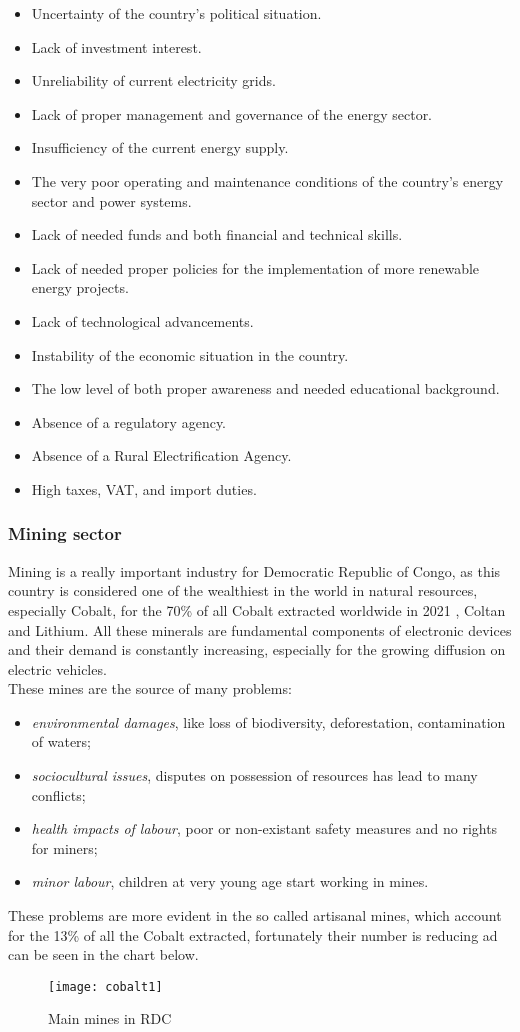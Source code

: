 \documentclass{article}
\begin{document}
\begin{itemize}
\item Uncertainty of the country's political situation. 
\item Lack of investment interest. 
\item Unreliability of current electricity grids. 
\item Lack of proper management and governance of the energy sector. 
\item Insufficiency of the current energy supply. 
\item The very poor operating and maintenance conditions of the country's energy sector and power systems. 
\item Lack of needed funds and both financial and technical skills. 
\item Lack of needed proper policies for the implementation of more renewable energy projects. 
\item Lack of technological advancements. 
\item Instability of the economic situation in the country. 
\item The low level of both proper awareness and needed educational background. 
\item Absence of a regulatory agency.
\item Absence of a Rural Electrification Agency.
\item High taxes, VAT, and import duties.
\end{itemize}
\newpage
\subsubsection{Mining sector}
Mining is a really important industry for Democratic Republic of Congo, as this country is considered one of the wealthiest in the world in natural resources, especially Cobalt, for the 70\% of all Cobalt extracted worldwide in 2021 \cite{cobalt}, Coltan and Lithium. All these minerals are fundamental components of electronic devices and their demand is constantly increasing, especially for the growing diffusion on electric vehicles.\\
These mines are the source of many problems:
\begin{itemize}
\item \textit{environmental damages}, like loss of biodiversity, deforestation, contamination of waters;
\item \textit{sociocultural issues}, disputes on possession of resources has lead to many conflicts;
\item \textit{health impacts of labour}, poor or non-existant safety measures and no rights for miners;
\item \textit{minor labour}, children at very young age start working in mines.
\end{itemize}
These problems are more evident in the so called artisanal mines, which account for the 13\% of all the Cobalt extracted\cite{cobalt}, fortunately their number is reducing ad can be seen in the chart below. 
\begin{figure}[H]
\centering
\texttt{[image: cobalt1]}
\caption{Main mines in RDC \cite{cobalt1}}
\end{figure}
\newpage
\end{document}
